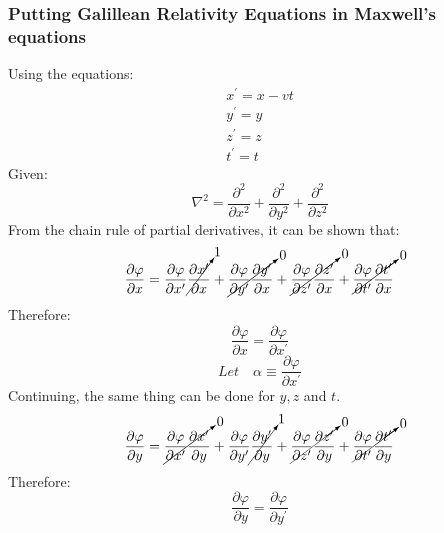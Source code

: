 \documentclass[journal]{IEEEtran}
\begin{document}
\subsubsection{Putting Galillean Relativity Equations in Maxwell's
equations}
Using the equations:
\begin{eqnarray}
x^\prime = x-vt\\
y^\prime = y\\
z^\prime = z\\
t^\prime = t
\end{eqnarray}
Given:
\begin{equation}
\nabla^2 = \frac{\partial^2}{\partial x^2} +  
                   \frac{\partial^2}{\partial y^2} +
                   \frac{\partial^2}{\partial z^2}
\end{equation}
From the chain rule of partial derivatives, it can be shown that:
\begin{equation}
\frac{\partial\varphi}{\partial x}=
\frac{\partial\varphi}{\partial x^\prime}
\cancelto{1}{\frac{\partial x^\prime}{\partial x}} +
\cancelto{0}{\frac{\partial\varphi}{\partial y^\prime}
\frac{\partial y^\prime}{\partial x}} +
\cancelto{0}{\frac{\partial\varphi}{\partial z^\prime}
\frac{\partial z^\prime}{\partial x}} +
\cancelto{0}{\frac{\partial\varphi}{\partial t^\prime}
\frac{\partial t^\prime}{\partial x}}
\end{equation}
Therefore:
\begin{equation}
\boxed{
\frac{\partial\varphi}{\partial x} = 
\frac{\partial\varphi}{\partial x^\prime}}
\end{equation}
\begin{equation}
\boxed{
Let \quad \alpha\equiv\frac{\partial\varphi}{\partial x^\prime}}
\end{equation}
Continuing, the same thing can be done for $y, z$ and $t$.
\begin{equation}
\frac{\partial\varphi}{\partial y}=
\cancelto{0}{\frac{\partial\varphi}{\partial x^\prime}
\frac{\partial x^\prime}{\partial y}} +
\frac{\partial\varphi}{\partial y^\prime}
\cancelto{1}{\frac{\partial y^\prime}{\partial y}} +
\cancelto{0}{\frac{\partial\varphi}{\partial z^\prime}
\frac{\partial z^\prime}{\partial y}} +
\cancelto{0}{\frac{\partial\varphi}{\partial t^\prime}
\frac{\partial t^\prime}{\partial y}}
\end{equation}
Therefore:
\begin{equation}
\boxed{
\frac{\partial\varphi}{\partial y} = 
\frac{\partial\varphi}{\partial y^\prime}}
\end{equation}
\end{document}
